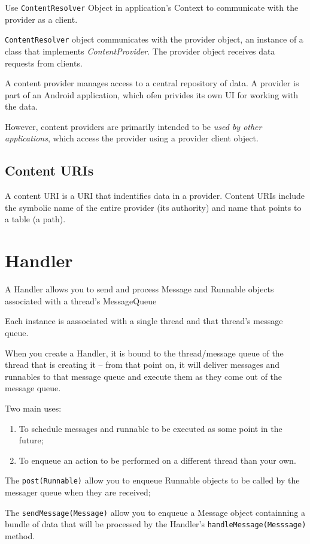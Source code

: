 \documentclass[11pt, a4paper]{book}
\begin{document}
Use \verb|ContentResolver| Object in application's Context to communicate with
the provider as a client. 

\verb|ContentResolver| object communicates with the provider object, an instance
of a class that implements \emph{ContentProvider}. The provider object receives
data requests from clients. 

A content provider manages access to a central repository of data. A provider is
part of an Android application, which ofen privides its own UI for working with
the data. 

However, content providers are primarily intended to be \emph{used by other
applications}, which access the provider using a provider client object. 

\subsection{Content URIs}
A content URI is a URI that indentifies data in a provider. Content URIs include
the symbolic name of the entire provider (its authority) and name that points to
a table (a path).
\section{Handler}
A Handler allows you to send and process Message and Runnable objects associated
with a thread's MessageQueue

Each instance is aassociated with a single thread and that thread's message
queue.

When you create a Handler, it is bound to the thread/message queue of the thread
that is creating it -- from that point on, it will deliver messages and
runnables to that message queue and execute them as they come out of the message
queue. 

Two main uses:
\begin{enumerate}
\item To schedule messages and runnable to be executed as some point in the
future;
\item To enqueue an action to be performed on a different thread than your own.
\end{enumerate}

The \verb|post(Runnable)| allow you to enqueue Runnable objects to be called by
the messager queue when they are received;

The \verb|sendMessage(Message)| allow you to enqueue a Message object
containning a bundle of data that will be processed by the Handler's
\verb|handleMessage(Messsage)| method.
\end{document}
